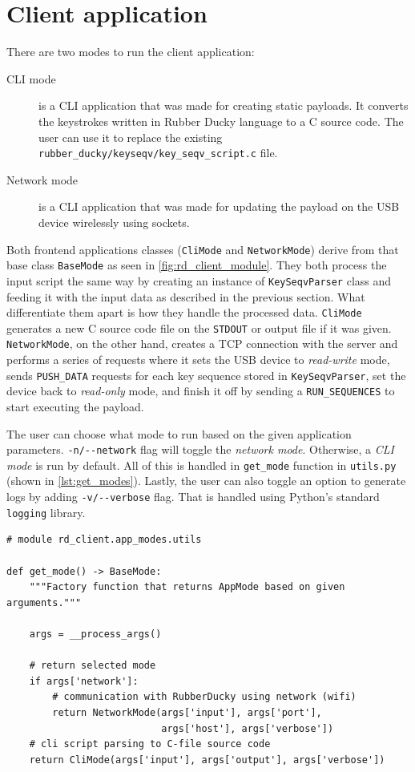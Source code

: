 \section{Client application}
\label{sec:implementation_client}
There are two modes to run the client application:
\begin{description}
    \item [CLI mode] is a CLI application that was made for creating static payloads. It converts the keystrokes written in Rubber Ducky language to a C source code. The user can use it to replace the existing \verb|rubber_ducky/keyseqv/key_seqv_script.c| file.
    \item [Network mode] is a CLI application that was made for updating the payload on the USB device wirelessly using sockets.
\end{description}
Both frontend applications classes (\verb|CliMode| and \verb|NetworkMode|) derive from that base class \verb|BaseMode| as seen in \autoref{fig:rd_client_module}. They both process the input script the same way by creating an instance of \verb|KeySeqvParser| class and feeding it with the input data as described in the previous section. What differentiate them apart is how they handle the processed data. \verb|CliMode| generates a new C source code file on the \verb|STDOUT| or output file if it was given. \verb|NetworkMode|, on the other hand, creates a TCP connection with the server and performs a series of requests where it sets the USB device to \emph{read-write} mode, sends \verb|PUSH_DATA| requests for each key sequence stored in \verb|KeySeqvParser|, set the device back to \emph{read-only} mode, and finish it off by sending a \verb|RUN_SEQUENCES| to start executing the payload.

The user can choose what mode to run based on the given application parameters. \verb|-n/--network| flag will toggle the \emph{network mode}. Otherwise, a \emph{CLI mode} is run by default. All of this is handled in \verb|get_mode| function in \verb|utils.py| (shown in \autoref{lst:get_modes}). Lastly, the user can also toggle an option to generate logs by adding \verb|-v/--verbose| flag. That is handled using Python's standard \verb|logging| library.

\begin{lstlisting}
# module rd_client.app_modes.utils

def get_mode() -> BaseMode:
    """Factory function that returns AppMode based on given arguments."""

    args = __process_args()

    # return selected mode
    if args['network']:
        # communication with RubberDucky using network (wifi)
        return NetworkMode(args['input'], args['port'],
                           args['host'], args['verbose'])
    # cli script parsing to C-file source code
    return CliMode(args['input'], args['output'], args['verbose'])
\end{lstlisting}

